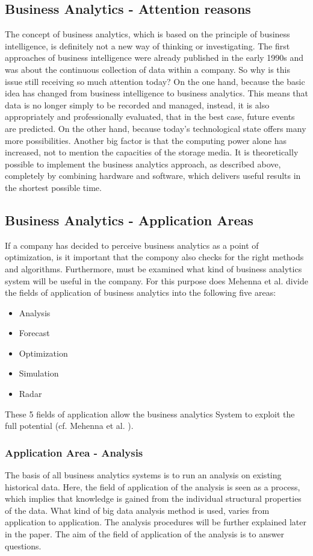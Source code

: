 \documentclass[12pt,twocolumn,twoside]{conference}   %
\begin{document}
\subsection{Business Analytics - Attention reasons}
The concept of business analytics, which is based on the principle of business intelligence, is definitely not a new way of thinking or investigating. The first approaches of business intelligence were already published in the early 1990s and was about the continuous collection of data within a company. So why is this issue still receiving so much attention today? On the one hand, because the basic idea has changed from business intelligence to business analytics. This means that data is no longer simply to be recorded and managed, instead, it is also appropriately and professionally evaluated, that in the best case, future events are predicted. On the other hand, because today's technological state offers many more possibilities. Another big factor is that the computing power alone has increased, not to mention the capacities of the storage media.  It is theoretically possible to implement the business analytics approach, as described above, completely by combining hardware and software, which delivers useful results in the shortest possible time.

\subsection{Business Analytics - Application Areas}
If a company has decided to perceive business analytics as a point of optimization, is it important that the compony also checks for the right methods and algorithms. Furthermore, must be examined what kind of business analytics system will be useful in the company. For this purpose does Mehenna et al. divide the fields of application of business analytics into the following five areas:

\begin{itemize}
\item Analysis
\item Forecast
\item Optimization
\item Simulation
\item Radar
\end{itemize}

These 5 fields of application allow the business analytics System to exploit the full potential (cf. Mehenna et al. \cite{2}).

\subsubsection{Application Area - Analysis}
The basis of all business analytics systems is to run an analysis on existing historical data. Here, the field of application of the analysis is seen as a process, which implies that knowledge is gained from the individual structural properties of the data. What kind of big data analysis method is used, varies from application to application. The analysis procedures will be further explained later in the paper. The aim of the field of application of the analysis is to answer questions. 
\end{document}
